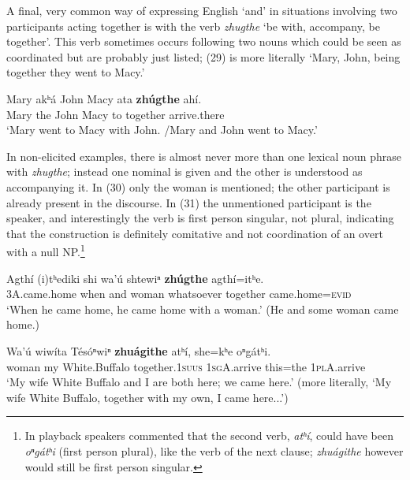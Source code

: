 \documentclass[output=paper]{LSP/langsci}
\begin{document}
 A final, very common way of expressing English `and' in situations involving two participants acting together is with the verb \textit{zhugthe} `be with, accompany, be together'. This verb sometimes occurs following two nouns which could be seen as coordinated but are probably just listed; (29) is more literally `Mary, John, being together they went to Macy.'

\begin{exe}	
\ex
\gll Mary akʰ\'a  John	Macy ata 	\textbf{zh\'ugthe} 	ah\'i. \\
Mary the John Macy to  together arrive.there \\
\trans `Mary went to Macy with John. /Mary and John went to Macy.'
\end{exe}

In non-elicited examples, there is almost never more than one lexical noun phrase with \textit{zhugthe}; instead one nominal is given and the other is understood as accompanying it. In (30) only the woman is mentioned; the other participant is already present in the discourse. In (31) the unmentioned participant is the speaker, and interestingly the verb is first person singular, not plural, indicating that the construction is definitely comitative and not coordination of an overt with a null NP.\footnote{In playback speakers commented that the second verb, \textit{atʰ\'i}, could have been \textit{oⁿg\'atʰi} (first person plural), like the verb of the next clause; \textit{zhu\'agithe} however would still be first person singular.}   

\begin{exe}	
\ex
\gll Agth\'i (i)tʰediki shi wa'\'u shtewiⁿ \textbf{zh\'ugthe} agth\'i=itʰe. \\
\textsc{3A}.came.home 	when and woman whatsoever together came.home=\textsc{evid} \\
\vspace{-2.5em}\trans `When he came home, he came home with a woman.' (He and some woman came home.)

\ex
\gll Wa'\'u  wiw\'ita T\'es\'oⁿwiⁿ \textbf{zhu\'agithe}  atʰ\'i, she=kʰe oⁿg\'atʰi. \\
woman 	my  White.Buffalo together.1\textsc{suus}  \textsc{1sgA}.arrive	this=the 	\textsc{1plA}.arrive \\
\trans `My wife White Buffalo and I are both here; we came here.' (more literally, `My wife White Buffalo, together with my own, I came here...')
\end{exe}
\end{document}
